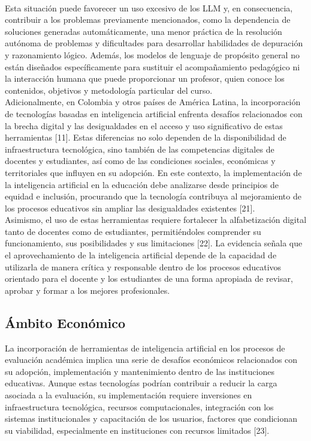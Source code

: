 \documentclass[letterpaper, 10 pt, conference]{ieeeconf}
\begin{document}
    \\
    Esta situación puede favorecer un uso excesivo de los LLM y, en consecuencia, contribuir a los problemas previamente mencionados, como la dependencia de soluciones generadas automáticamente, una menor práctica de la resolución autónoma de problemas y dificultades para desarrollar habilidades de depuración y razonamiento lógico. Además, los modelos de lenguaje de propósito general no están diseñados específicamente para sustituir el acompañamiento pedagógico ni la interacción humana que puede proporcionar un profesor, quien conoce los contenidos, objetivos y metodología particular del curso.
    \\
    Adicionalmente, en Colombia y otros países de América Latina, la incorporación de tecnologías basadas en inteligencia artificial enfrenta desafíos relacionados con la brecha digital y las desigualdades en el acceso y uso significativo de estas herramientas [11]. Estas diferencias no solo dependen de la disponibilidad de infraestructura tecnológica, sino también de las competencias digitales de docentes y estudiantes, así como de las condiciones sociales, económicas y territoriales que influyen en su adopción. En este contexto, la implementación de la inteligencia artificial en la educación debe analizarse desde principios de equidad e inclusión, procurando que la tecnología contribuya al mejoramiento de los procesos educativos sin ampliar las desigualdades existentes [21].
    \\
    Asimismo, el uso de estas herramientas requiere fortalecer la alfabetización digital tanto de docentes como de estudiantes, permitiéndoles comprender su funcionamiento, sus posibilidades y sus limitaciones [22]. La evidencia señala que el aprovechamiento de la inteligencia artificial depende de la capacidad de utilizarla de manera crítica y responsable dentro de los procesos educativos orientado para el docente y los estudiantes de una forma apropiada de revisar, aprobar y formar a los mejores profesionales.

    \subsection{Ámbito Económico} 
    La incorporación de herramientas de inteligencia artificial en los procesos de evaluación académica implica una serie de desafíos económicos relacionados con su adopción, implementación y mantenimiento dentro de las instituciones educativas. Aunque estas tecnologías podrían contribuir a reducir la carga asociada a la evaluación, su implementación requiere inversiones en infraestructura tecnológica, recursos computacionales, integración con los sistemas institucionales y capacitación de los usuarios, factores que condicionan su viabilidad, especialmente en instituciones con recursos limitados [23].
\end{document}
